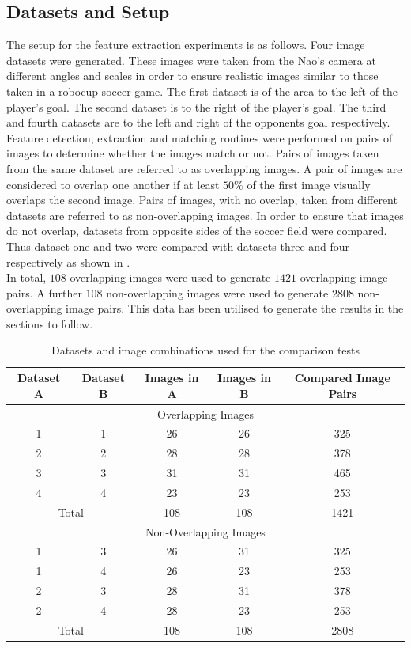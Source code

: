 \documentclass{article}
\begin{document}
\subsection{Datasets and Setup}
\label{sec:datasets}
The setup for the feature extraction experiments is as follows. Four image datasets were generated. These images were taken from the Nao's camera at different angles and scales in order to ensure realistic images similar to those taken in a robocup soccer game. The first dataset is of the area to the left of the player's goal. The second dataset is to the right of the player's goal. The third and fourth datasets are to the left and right of the opponents goal respectively.\\

Feature detection, extraction and matching routines were performed on pairs of images to determine whether the images match or not. Pairs of images taken from the same dataset are referred to as overlapping images. A pair of images are considered to overlap one another if at least $50\%$ of the first image visually overlaps the second image. Pairs of images, with no overlap, taken from different datasets are referred to as non-overlapping images. In order to ensure that images do not overlap, datasets from opposite sides of the soccer field were compared. Thus dataset one and two were compared with datasets three and four respectively as shown in . \\

In total, $108$ overlapping images were used to generate $1421$ overlapping image pairs. A further $108$ non-overlapping images were used to generate $2808$ non-overlapping image pairs. This data has been utilised to generate the results in the sections to follow. \\ 

\begin{table}
\caption{Datasets and image combinations used for the comparison tests}
\begin{tabular}{|c|c|c|c|c|}
\hline 
Dataset A & Dataset B & Images in A & Images in B & Compared Image Pairs\tabularnewline
\hline 
\hline 
\multicolumn{5}{|c}{Overlapping Images}\tabularnewline
\hline 
1 & 1 & 26 & 26 & 325\tabularnewline
\hline 
2 & 2 & 28 & 28 & 378\tabularnewline
\hline 
3 & 3 & 31 & 31 & 465\tabularnewline
\hline 
4 & 4 & 23 & 23 & 253\tabularnewline
\hline 
\multicolumn{2}{|c|}{Total} & 108 & 108 & 1421\tabularnewline
\hline 
\multicolumn{5}{|c}{Non-Overlapping Images}\tabularnewline
\hline 
1 & 3 & 26 & 31 & 325\tabularnewline
\hline 
1 & 4 & 26 & 23 & 253\tabularnewline
\hline 
2 & 3 & 28 & 31 & 378\tabularnewline
\hline 
2 & 4 & 28 & 23 & 253\tabularnewline
\hline 
\multicolumn{2}{|c|}{Total} & 108 & 108 & 2808\tabularnewline
\hline 
\end{tabular}
\label{table:overlap}
\end{table}
\end{document}
